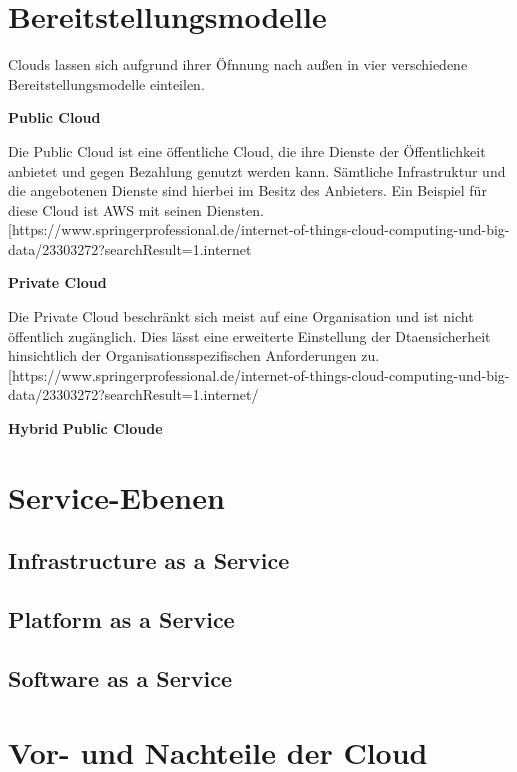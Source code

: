 \section{Bereitstellungsmodelle}
Clouds lassen sich aufgrund ihrer Öfnnung nach außen in vier verschiedene Bereitstellungsmodelle einteilen. 

\textbf{Public Cloud}

Die Public Cloud ist eine öffentliche Cloud, die ihre Dienste der Öffentlichkeit anbietet und gegen Bezahlung genutzt werden kann. Sämtliche Infrastruktur und die angebotenen Dienste sind hierbei im Besitz des Anbieters. Ein Beispiel für diese Cloud ist AWS mit seinen Diensten.[https://www.springerprofessional.de/internet-of-things-cloud-computing-und-big-data/23303272?searchResult=1.internet%

\textbf{Private Cloud}

Die Private Cloud beschränkt sich meist auf eine Organisation und ist nicht öffentlich zugänglich. Dies lässt eine erweiterte Einstellung der Dtaensicherheit hinsichtlich der Organisationsspezifischen Anforderungen zu. [https://www.springerprofessional.de/internet-of-things-cloud-computing-und-big-data/23303272?searchResult=1.internet/%

\textbf{Hybrid }
\textbf{Public Cloude}


\section{Service-Ebenen}
\subsection{Infrastructure as a Service}
\subsection{Platform as a Service}
\subsection{Software as a Service}

\section{Vor- und Nachteile der Cloud}